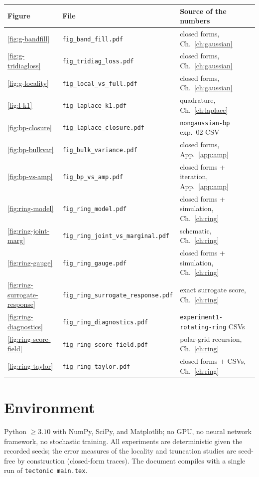 \begin{center}\small
\begin{tabular}{@{}lll@{}}
\toprule
Figure & File & Source of the numbers \\
\midrule
\ref{fig:g-bandfill} & \texttt{fig\_band\_fill.pdf} & closed forms, Ch.~\ref{ch:gaussian} \\
\ref{fig:g-tridiagloss} & \texttt{fig\_tridiag\_loss.pdf} & closed forms, Ch.~\ref{ch:gaussian} \\
\ref{fig:g-locality} & \texttt{fig\_local\_vs\_full.pdf} & closed forms, Ch.~\ref{ch:gaussian} \\
\ref{fig:l-k1} & \texttt{fig\_laplace\_k1.pdf} & quadrature, Ch.~\ref{ch:laplace} \\
\ref{fig:bp-closure} & \texttt{fig\_laplace\_closure.pdf} & \texttt{nongaussian-bp} exp.~02 CSV \\
\ref{fig:bp-bulkvar} & \texttt{fig\_bulk\_variance.pdf} & closed forms, App.~\ref{app:amp} \\
\ref{fig:bp-vs-amp} & \texttt{fig\_bp\_vs\_amp.pdf} & closed forms + iteration, App.~\ref{app:amp} \\
\ref{fig:ring-model} & \texttt{fig\_ring\_model.pdf} & closed forms + simulation, Ch.~\ref{ch:ring} \\
\ref{fig:ring-joint-marg} & \texttt{fig\_ring\_joint\_vs\_marginal.pdf} & schematic, Ch.~\ref{ch:ring} \\
\ref{fig:ring-gauge} & \texttt{fig\_ring\_gauge.pdf} & closed forms + simulation, Ch.~\ref{ch:ring} \\
\ref{fig:ring-surrogate-response} & \texttt{fig\_ring\_surrogate\_response.pdf} & exact surrogate score, Ch.~\ref{ch:ring} \\
\ref{fig:ring-diagnostics} & \texttt{fig\_ring\_diagnostics.pdf} & \texttt{experiment1-rotating-ring} CSVs \\
\ref{fig:ring-score-field} & \texttt{fig\_ring\_score\_field.pdf} & polar-grid recursion, Ch.~\ref{ch:ring} \\
\ref{fig:ring-taylor} & \texttt{fig\_ring\_taylor.pdf} & closed forms $+$ CSVs, Ch.~\ref{ch:ring} \\
\bottomrule
\end{tabular}
\end{center}

\section{Environment}

Python $\geq 3.10$ with NumPy, SciPy, and Matplotlib; no GPU, no neural
network framework, no stochastic training. All experiments are
deterministic given the recorded seeds; the error measures of the
locality and truncation studies are seed-free by construction
(closed-form traces). The document compiles with a single run of
\texttt{tectonic main.tex}.
